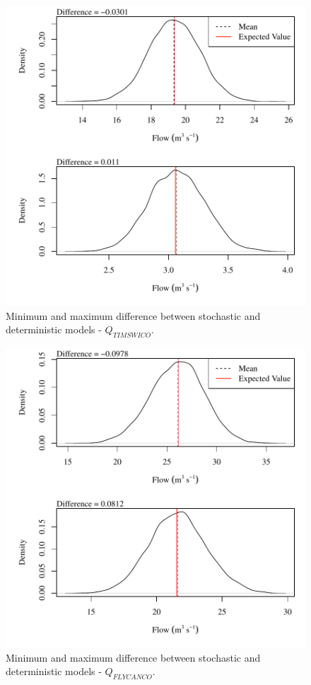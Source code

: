 \begin{center}
\begin{figure}[htbp]
	\includegraphics[width=6in]{"Figures/Results_USR/V min-max diff qTIM"}
	\caption{Minimum and maximum difference between stochastic and deterministic models - $Q_{TIMSWICO}$.}
\end{figure}
\end{center}
\newpage

\begin{center}
\begin{figure}[htbp]
	\includegraphics[width=6in]{"Figures/Results_USR/V min-max diff qFLY"}
	\caption{Minimum and maximum difference between stochastic and deterministic models - $Q_{FLYCANCO}$.}
\end{figure}
\end{center}
\newpage

